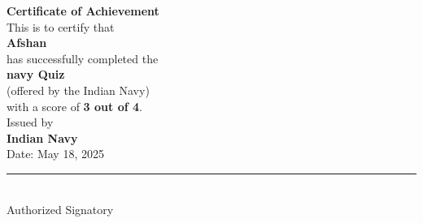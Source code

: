 \documentclass[a4paper,12pt]{article}
\begin{document}
\begin{center}
{\LARGE \textbf{Certificate of Achievement}}\\
\vspace{0.5cm}
{\large This is to certify that}\\
\vspace{0.3cm}
{\Large \textbf{Afshan}}\\
\vspace{0.3cm}
{\large has successfully completed the}\\
\vspace{0.2cm}
{\large \textbf{navy Quiz}}\\
\vspace{0.2cm}
{\large(offered by the Indian Navy)}\\
\vspace{0.2cm}
{\large with a score of \textbf{3 out of 4}.}\\
\vspace{0.5cm}
{\large Issued by}\\
\vspace{0.2cm}
{\Large \textbf{Indian Navy}}\\
\vspace{0.5cm}
{\large Date: May 18, 2025}
\end{center}
\vspace{1cm}
\begin{center}
\rule{4cm}{0.4pt}\\
{\normalsize Authorized Signatory}
\end{center}
\end{document}
